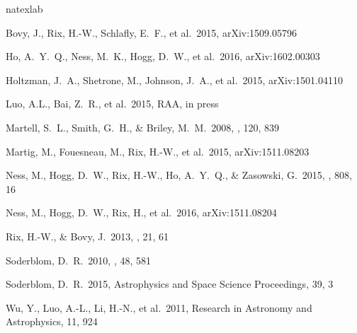 \documentclass[12pt, preprint]{aastex}
\newcommand{\apogee}{APOGEE}
\newcommand{\lamost}{LAMOST}
\newcommand{\mh}{\mbox{$\rm [M/H]$}}
\newcommand{\alpham}{\mbox{$\rm [\alpha/M]$}}
\begin{document}



\begin{thebibliography}{24}
\expandafter\ifx\csname natexlab\endcsname\relax\def\natexlab#1{#1}\fi

 Bovy, J., Rix, H.-W., 
Schlafly, E.~F., et al.\ 2015, arXiv:1509.05796 

 Ho, A.~Y.~Q., Ness, M.~K., 
Hogg, D.~W., et al.\ 2016, arXiv:1602.00303 

 Holtzman, J.~A., 
Shetrone, M., Johnson, J.~A., et al.\ 2015, arXiv:1501.04110 

 Luo, A.L., Bai, Z.~R., et al.\ 2015, RAA, in press

 Martell, S.~L., Smith, 
G.~H., \& Briley, M.~M.\ 2008, \pasp, 120, 839 

 Martig, M., Fouesneau, M., Rix, H.-W., et al.\ 2015, arXiv:1511.08203 

 Ness, M., Hogg, D.~W., 
Rix, H.-W., Ho, A.~Y.~Q., \& Zasowski, G.\ 2015, \apj, 808, 16 

 Ness, M., Hogg, D.~W., 
Rix, H., et al.\ 2016, arXiv:1511.08204 

 Rix, H.-W., \& Bovy, J.\ 2013, \aapr, 21, 61 

 Soderblom, D.~R.\ 2010, \araa, 48, 581 

 Soderblom, D.~R.\ 2015, 
Astrophysics and Space Science Proceedings, 39, 3 

 Wu, Y., Luo, A.-L., Li, 
H.-N., et al.\ 2011, Research in Astronomy and Astrophysics, 11, 924 

\end{thebibliography}
\end{document}

